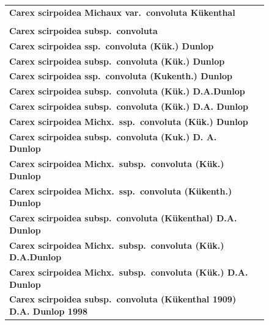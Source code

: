 \documentclass{bmcart}
\begin{document}
\begin{figure}
\begin{center}
{\begin{tabular}{| l | c |}
      \textbf{Carex scirpoidea Michaux var.\ convoluta Kükenthal} & \\
      & \\
      \textbf{Carex scirpoidea subsp.\ convoluta} & \\
      \textbf{Carex scirpoidea ssp.\ convoluta (Kük.) Dunlop} & \\
      \textbf{Carex scirpoidea subsp.\ convoluta (Kük.) Dunlop} & \\
      \textbf{Carex scirpoidea ssp.\ convoluta (Kukenth.) Dunlop} & \\
      \textbf{Carex scirpoidea subsp.\ convoluta (Kük.) D.A.Dunlop} & \\
      \textbf{Carex scirpoidea subsp.\ convoluta (Kük.) D.A. Dunlop} & \\
      \textbf{Carex scirpoidea Michx.\ ssp.\ convoluta (Kük.) Dunlop} & \\
      \textbf{Carex scirpoidea subsp.\ convoluta (Kuk.) D. A. Dunlop} & \\
      \textbf{Carex scirpoidea Michx.\ subsp.\ convoluta (Kük.) Dunlop} & \\
      \textbf{Carex scirpoidea Michx.\ ssp.\ convoluta (Kükenth.) Dunlop} & \\
      \textbf{Carex scirpoidea subsp.\ convoluta (Kükenthal) D.A. Dunlop} & \\
      \textbf{Carex scirpoidea Michx.\ subsp.\ convoluta (Kük.) D.A.Dunlop} & \\
      \textbf{Carex scirpoidea Michx.\ subsp.\ convoluta (Kük.) D.A. Dunlop} & \\
      \textbf{Carex scirpoidea subsp.\ convoluta (Kükenthal 1909) D.A. Dunlop 1998} & \\
      \hline
      \end{tabular}
    }
  \end{center}
\end{figure}
\end{document}
